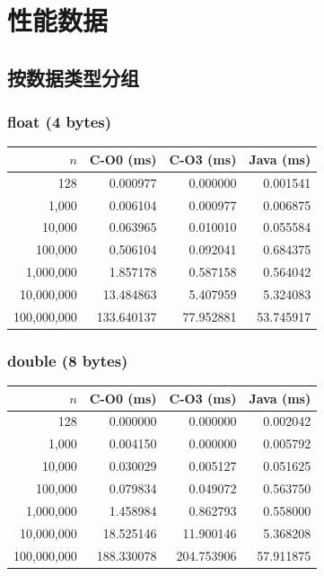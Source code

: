 \documentclass[12pt,a4paper]{article}
\begin{document}
\section{性能数据}

\subsection{按数据类型分组}

\subsubsection*{float (4 bytes)}

\begin{table}[H]
\centering
\begin{tabular}{r r r r}
\toprule
$n$ & C-O0 (ms) & C-O3 (ms) & Java (ms) \\
\midrule
128         & 0.000977 & 0.000000 & 0.001541 \\
1{,}000     & 0.006104 & 0.000977 & 0.006875 \\
10{,}000    & 0.063965 & 0.010010 & 0.055584 \\
100{,}000   & 0.506104 & 0.092041 & 0.684375 \\
1{,}000{,}000   & 1.857178 & 0.587158 & 0.564042 \\
10{,}000{,}000  & 13.484863 & 5.407959 & 5.324083 \\
100{,}000{,}000 & 133.640137 & 77.952881 & 53.745917 \\
\bottomrule
\end{tabular}
\end{table}

\subsubsection*{double (8 bytes)}

\begin{table}[H]
\centering
\begin{tabular}{r r r r}
\toprule
$n$ & C-O0 (ms) & C-O3 (ms) & Java (ms) \\
\midrule
128         & 0.000000 & 0.000000 & 0.002042 \\
1{,}000     & 0.004150 & 0.000000 & 0.005792 \\
10{,}000    & 0.030029 & 0.005127 & 0.051625 \\
100{,}000   & 0.079834 & 0.049072 & 0.563750 \\
1{,}000{,}000   & 1.458984 & 0.862793 & 0.558000 \\
10{,}000{,}000  & 18.525146 & 11.900146 & 5.368208 \\
100{,}000{,}000 & 188.330078 & 204.753906 & 57.911875 \\
\bottomrule
\end{tabular}
\end{table}
\end{document}
